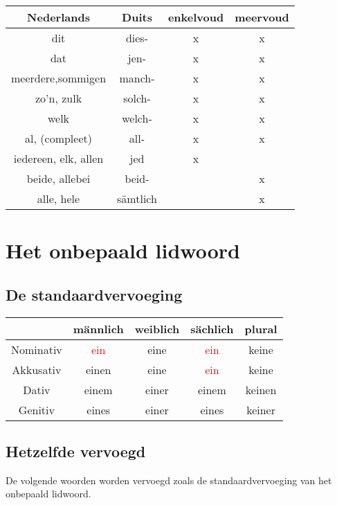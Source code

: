 \documentclass[main.tex]{subfiles}
\begin{document}
\begin{tabular}{|c|c|c|c|}
\hline 
\rowcolor{gray}
Nederlands & Duits & enkelvoud & meervoud \\ 
\hline 
dit & dies- & x & x \\ 
\hline 
dat & jen- & x & x \\ 
\hline 
meerdere,sommigen & manch- & x & x \\ 
\hline 
zo'n, zulk & solch- & x & x \\ 
\hline 
welk & welch- & x & x \\ 
\hline 
al, (compleet) & all- & x & x \\ 
\hline 
iedereen, elk, allen & jed & x &  \\ 
\hline 
beide, allebei & beid- &  & x \\ 
\hline 
alle, hele & sämtlich &  & x \\ 
\hline 
\end{tabular} 
\section{Het onbepaald lidwoord}
\subsection{De standaardvervoeging}

\begin{tabular}{|c|c|c|c|c|}
\hline 
\rowcolor{gray}
& männlich & weiblich & sächlich & plural \\ 
\hline 
\cellcolor[gray]{0.8}Nominativ & \textcolor{red}{ein} & eine & \textcolor{red}{ein} & keine \\ 
\hline 
\cellcolor[gray]{0.8}Akkusativ & einen & eine & \textcolor{red}{ein} & keine \\ 
\hline 
\cellcolor[gray]{0.8}Dativ & einem & einer & einem & keinen \\ 
\hline 
\cellcolor[gray]{0.8}Genitiv & eines & einer & eines & keiner \\ 
\hline 
\end{tabular} 

\subsection{Hetzelfde vervoegd}
De volgende woorden worden vervoegd zoals de standaardvervoeging van het onbepaald lidwoord.
\end{document}
